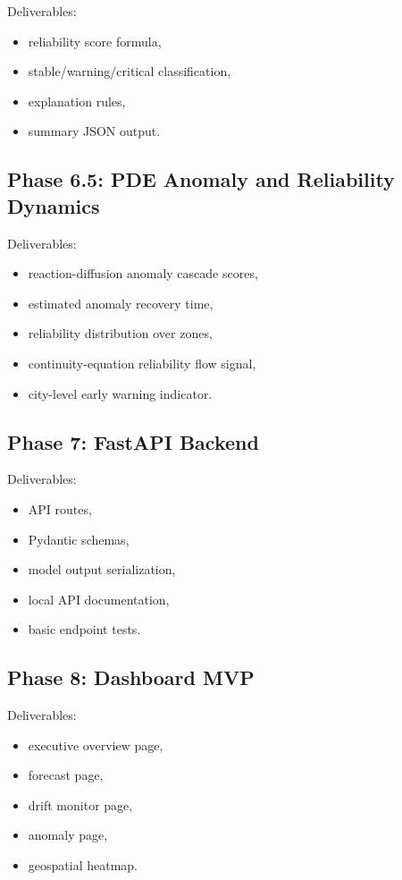 \documentclass[11pt]{article}
\begin{document}
Deliverables:

\begin{itemize}
    \item reliability score formula,
    \item stable/warning/critical classification,
    \item explanation rules,
    \item summary JSON output.
\end{itemize}

\subsection{Phase 6.5: PDE Anomaly and Reliability Dynamics}

Deliverables:

\begin{itemize}
    \item reaction-diffusion anomaly cascade scores,
    \item estimated anomaly recovery time,
    \item reliability distribution over zones,
    \item continuity-equation reliability flow signal,
    \item city-level early warning indicator.
\end{itemize}

\subsection{Phase 7: FastAPI Backend}

Deliverables:

\begin{itemize}
    \item API routes,
    \item Pydantic schemas,
    \item model output serialization,
    \item local API documentation,
    \item basic endpoint tests.
\end{itemize}

\subsection{Phase 8: Dashboard MVP}

Deliverables:

\begin{itemize}
    \item executive overview page,
    \item forecast page,
    \item drift monitor page,
    \item anomaly page,
    \item geospatial heatmap.
\end{itemize}
\end{document}
